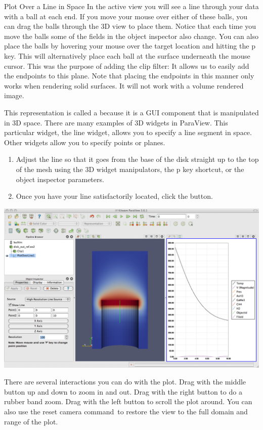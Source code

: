 \begin{exercise}{Plot Over a Line in Space}
  In the active view you will see a line through your data with a ball at
  each end.  If you move your mouse over either of these balls, you can
  drag the balls through the 3D view to place them.  Notice that each time
  you move the balls some of the fields in the object inspector also
  change.  You can also place the balls by hovering your mouse over the
  target location and hitting the p key.  This will alternatively place
  each ball at the surface underneath the mouse cursor.  This was the
  purpose of adding the clip filter: It allows us to easily add the
  endpoints to this plane.  Note that placing the endpoints in this manner
  only works when rendering solid surfaces.  It will not work with a volume
  rendered image.

  This representation is called a  because it is a GUI
  component that is manipulated in 3D space.  There are many examples of 3D
  widgets in ParaView.  This particular widget, the line widget, allows you
  to specify a line segment in space.  Other widgets allow you to specify
  points or planes.

  \begin{enumerate}
    \restorecounter
  \item Adjust the line so that it goes from the base of the disk straight up
    to the top of the mesh using the 3D widget manipulators, the p key
    shortcut, or the object inspector parameters.
  \item Once you have your line satisfactorily located, click the \apply
    button.
  \end{enumerate}

  \begin{inlinefig}
    \includegraphics[width=\scw]{images/LinePlot2}
  \end{inlinefig}

  There are several interactions you can do with the plot.  Drag with the
  middle button up and down to zoom in and out.  Drag with the right button
  to do a rubber band zoom.  Drag with the left button to scroll the plot
  around.  You can also use the reset camera command~\resetCamera to restore
  the view to the full domain and range of the plot.
\end{exercise}

